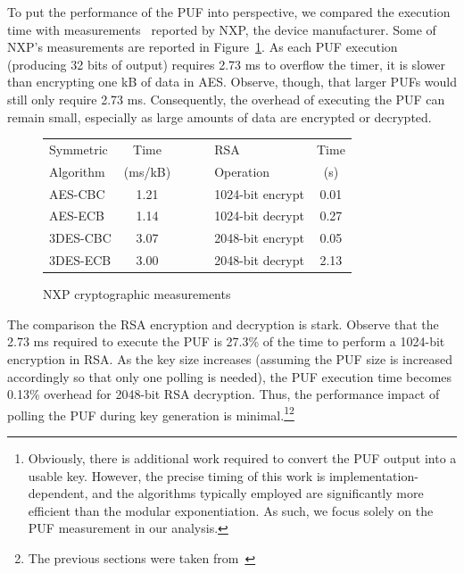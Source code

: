 To put the performance of the PUF into perspective, we compared the execution time with measurements~\cite{nxp}
reported by NXP, the device manufacturer.  Some of NXP's measurements are reported in Figure~\ref{fig:aes}.
As each PUF execution (producing 32 bits of output) requires 2.73 ms to overflow
the timer, it is slower than encrypting one kB of data in AES.  Observe, though, that larger PUFs would
still only require 2.73 ms.  Consequently, the overhead of executing the PUF can remain small, especially
as large amounts of data are encrypted or decrypted.

\begin{figure}[ht]
\begin{center}
\begin{tabular}{l | c c l | c}
Symmetric 	& Time		& ~~~	& RSA			& Time\\
Algorithm	& (ms/kB)	& ~~~	& Operation		& (s)\\
\cline{1-2}\cline{4-5}
AES-CBC		& 1.21		& ~	& 1024-bit encrypt	& 0.01 \\
AES-ECB		& 1.14 		& ~	& 1024-bit decrypt	& 0.27 \\
3DES-CBC	& 3.07		& ~	& 2048-bit encrypt	& 0.05 \\
3DES-ECB	& 3.00		& ~	& 2048-bit decrypt	& 2.13
\end{tabular}
\caption{NXP cryptographic measurements}
\label{fig:aes}
\end{center}
\end{figure}

The comparison the RSA encryption and decryption is stark.  Observe that the 2.73 ms required to
execute the PUF is 27.3\% of the time to perform a 1024-bit encryption in RSA.  As the key size
increases (assuming the PUF size is increased accordingly so that only one polling is needed),
the PUF execution time becomes 0.13\% overhead for 2048-bit RSA decryption.  Thus, the performance
impact of polling the PUF during key generation is minimal.\footnote{Obviously, there is additional
work required to convert the PUF output into a usable key.  However, the precise timing of this
work is implementation-dependent, and the algorithms typically employed are significantly more
efficient than the modular exponentiation.  As such, we focus solely on the PUF measurement in
our analysis.}\footnote{The previous sections were taken from~\cite{PUFROK}}

